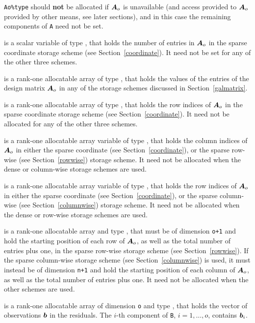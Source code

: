 \documentclass{galahad}
\begin{document}
\begin{description}
\begin{description}
\noindent
{\tt Ao\%type} should {\bf not} be allocated if ${\bm{A}}_o$ is unavailable
(and access provided to  ${\bm{A}}_o$ provided by other means, see later sections), 
and in this case the remaining components of {\tt A} need not be set.

 is a scalar variable of type \integer, that
holds the number of entries in ${\bm{A}}_o$
in the sparse coordinate storage scheme (see Section~\ref{coordinate}).
It need not be set for any of the other three schemes.

 is a rank-one allocatable array of type \realdp, that 
holds the values of the entries of the design matrix ${\bm{A}}_o$ in any of the
storage schemes discussed in Section~\ref{galmatrix}.

 is a rank-one allocatable array of type \integer,
that holds the row indices of ${\bm{A}}_o$ in the sparse coordinate storage
scheme (see Section~\ref{coordinate}).
It need not be allocated for any of the other three schemes.

 is a rank-one allocatable array variable of type \integer,
that holds the column indices of ${\bm{A}}_o$ in either the sparse coordinate
(see Section~\ref{coordinate}), or the sparse row-wise
(see Section~\ref{rowwise}) storage scheme.
It need not be allocated when the dense or column-wise storage schemes are used.

 is a rank-one allocatable array variable of type \integer,
that holds the row indices of ${\bm{A}}_o$ in either the sparse coordinate
(see Section~\ref{coordinate}), or the sparse column-wise
(see Section~\ref{columnwise}) storage scheme.
It need not be allocated when the dense or row-wise storage schemes are used.

 is a rank-one allocatable array and type \integer,
that must be of dimension {\tt o+1}
and hold the starting position of each row of ${\bm{A}}_o$, as well
as the total number of entries plus one, in the sparse row-wise storage
scheme (see Section~\ref{rowwise}).
If the sparse column-wise storage scheme (see Section~\ref{columnwise})
is used, it must instead be of dimension {\tt n+1}
and hold the starting position of each column of ${\bm{A}}_o$, as well
as the total number of entries plus one.
It need not be allocated when the
other schemes are used.

\end{description}

 is a rank-one allocatable array of dimension {\tt o} and type
\realdp, that holds the vector of observations ${\bm{b}}$ in the residuals.
The $i$-th component of {\tt B}, $i = 1, \ldots, o$, contains ${\bm{b}}_{i}$.


\end{description}
\end{document}
